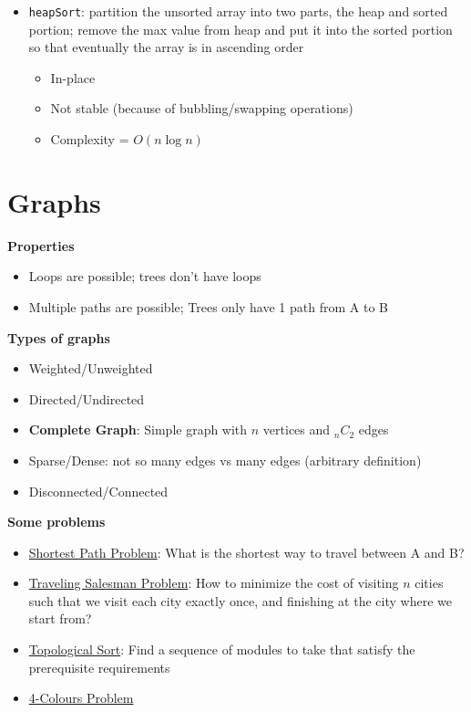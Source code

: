 \documentclass{article}
\begin{document}
\begin{multicols}{2}
\begin{itemize}
	\item \texttt{heapSort}: partition the unsorted array into two parts, the heap and sorted portion; remove the max value from heap and put it into the sorted portion so that eventually the array is in ascending order
	\begin{itemize}
		\item In-place
		\item Not stable (because of bubbling/swapping operations)
		\item Complexity = $O(n\log n)$
	\end{itemize}
\end{itemize}

\section{Graphs}
\textbf{Properties}
\begin{itemize}
	\item Loops are possible; trees don't have loops
	\item Multiple paths are possible; Trees only have 1 path from A to B
\end{itemize}
\textbf{Types of graphs}
\begin{itemize}
	\item Weighted/Unweighted
	\item Directed/Undirected
	\item \textbf{Complete Graph}: Simple graph with $n$ vertices and $_nC_2$ edges
	\item Sparse/Dense: not so many edges vs many edges (arbitrary definition)
	\item Disconnected/Connected
\end{itemize}
\textbf{Some problems}
\begin{itemize}
	\item \underline{Shortest Path Problem}: What is the shortest way to travel between A and B?
	\item \underline{Traveling Salesman Problem}: How to minimize the cost of visiting $n$ cities such that we visit each city exactly once, and finishing at the city where we start from?
	\item \underline{Topological Sort}: Find a sequence of modules to take that satisfy the prerequisite requirements
	\item \underline{4-Colours Problem}
\end{itemize}

\end{multicols}
\end{document}
